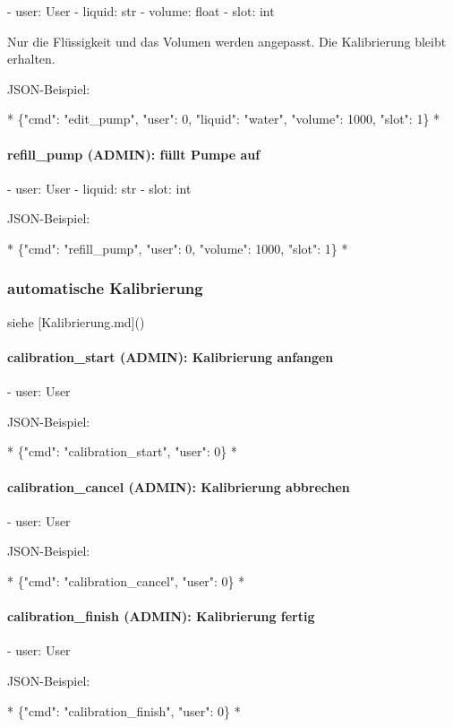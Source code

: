 - user: User
- liquid: str
- volume: float
- slot: int

Nur die Flüssigkeit und das Volumen werden angepasst. Die Kalibrierung bleibt erhalten.

JSON-Beispiel:

*
\{"cmd": "edit\_pump", "user": 0, "liquid": "water", "volume": 1000, "slot": 1\}
*

\paragraph{ refill\_pump (ADMIN): füllt Pumpe auf}

- user: User
- liquid: str
- slot: int

JSON-Beispiel:

*
\{"cmd": "refill\_pump", "user": 0, "volume": 1000, "slot": 1\}
*

\subsubsection{automatische Kalibrierung}

siehe [Kalibrierung.md]()

\paragraph{calibration\_start (ADMIN): Kalibrierung anfangen}

- user: User

JSON-Beispiel:

*
\{"cmd": "calibration\_start", "user": 0\}
*

\paragraph{calibration\_cancel (ADMIN): Kalibrierung abbrechen}

- user: User

JSON-Beispiel:

*
\{"cmd": "calibration\_cancel", "user": 0\}
*

\paragraph{ calibration\_finish (ADMIN): Kalibrierung fertig}

- user: User

JSON-Beispiel:

*
\{"cmd": "calibration\_finish", "user": 0\}
*

